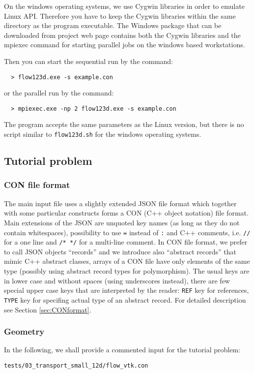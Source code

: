 \documentclass[12pt,a4paper]{report}
\begin{document}
On the windows operating systems, we use Cygwin libraries in order to emulate Linux API.
Therefore you have to keep the Cygwin libraries within the same directory as the program executable.
The Windows package that can be downloaded from project web page contains both the Cygwin libraries
and the mpiexec command for starting parallel jobs on the windows based workstations.

Then you can start the sequential run by the command:
\begin{verbatim}
  > flow123d.exe -s example.con
\end{verbatim}
or the parallel run by the command:
\begin{verbatim}
  > mpiexec.exe -np 2 flow123d.exe -s example.con
\end{verbatim}
The program accepts the same parameters as the Linux version, but there is no script similar to \verb'flow123d.sh' for the windows operating systems.


\subsection{Tutorial problem}
\subsubsection{CON file format}
The main input file uses a slightly extended JSON file format which together with some particular constructs forms a CON (C++ object notation) file format. 
Main extensions of the JSON are unquoted key names (as long as they do not contain whitespaces), possibility to use \verb'=' instead of \verb':' 
and C++ comments, i.e. \verb'//' for a one line and \verb'/* */' for a multi-line comment. In CON file format, we prefer to call JSON objects ``records'' and we introduce also ``abstract records''
that mimic C++ abstract classes, arrays of a CON file have only elements of the same type (possibly using abstract record types for polymorphism). 
The usual keys are in lower case and without spaces (using underscores instead),
there are few special upper case keys that are interpreted by the reader: \verb'REF' key for references, \verb'TYPE' key for specifing actual type of an abstract record.
For detailed description see Section \ref{sec:CONformat}.

\subsubsection{Geometry}
In the following, we shall provide a commented input for the tutorial problem:
\begin{verbatim}
tests/03_transport_small_12d/flow_vtk.con
\end{verbatim}
\end{document}
